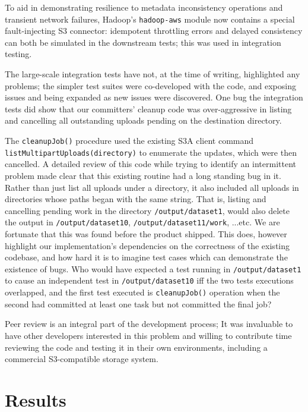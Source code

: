 \documentclass[format=acmsmall, screen=true, review=false]{acmart}
\begin{document}
To aid in demonstrating resilience to metadata inconsistency
operations and transient network failures, Hadoop's \texttt{hadoop-aws} module
now contains a special fault-injecting S3 connector: idempotent throttling errors and
delayed consistency can both be simulated in the downstream tests;
this was used in integration testing.

The large-scale integration tests have not, at the time of writing, highlighted any problems;
the simpler test suites were co-developed with the code, and exposing issues and
being expanded as new issues were discovered.
One bug the integration tests did show that our committers' cleanup code was
over-aggressive in listing and cancelling all outstanding uploads pending
on the destination directory.


The \texttt{cleanupJob()} procedure used the existing S3A client command
\texttt{listMultipartUploads(directory)} to enumerate the updates,
which were then cancelled.
A detailed review of this code while trying to identify an intermittent problem
made clear that this existing routine had a long standing bug in it.
Rather than just list all uploads under a directory, it also included
all uploads in directories whose paths began with the same string.
That is, listing and cancelling pending work in the directory \texttt{/output/dataset1},
would also delete the output in \texttt{/output/dataset10}, \texttt{/output/dataset11/work},
...etc.
We are fortunate that this was found before the product shipped.
This does, however highlight our implementation's dependencies on the correctness
of the existing codebase, and how hard it is to imagine test cases which
can demonstrate the existence of bugs.
Who would have expected a test running in \texttt{/output/dataset1} to
cause an independent test in \texttt{/output/dataset10} iff the two tests
executions overlapped, and the first test executed is \texttt{cleanupJob()}
operation when the second had committed at least one task but not committed
the final job?


Peer review is an integral part of the development process;
It was invaluable to have other developers interested in this problem
and willing to contribute time reviewing the code and testing it
in their own environments, including a commercial S3-compatible
storage system.



\section{Results}
\label{sec:results}
\end{document}
